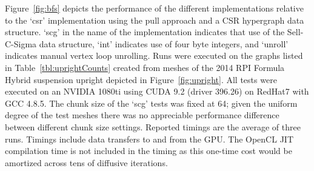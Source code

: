 \documentclass[graybox]{svmult}
\begin{document}
Figure~\ref{fig:bfs} depicts the performance of the different implementations
relative to the `csr' implementation using the pull approach and a CSR
hypergraph data structure.
`scg' in the name of the implementation indicates that use of the Sell-C-Sigma
data structure, `int' indicates use of four byte integers, and `unroll'
indicates manual vertex loop unrolling.
Runs were executed on the graphs listed in Table~\ref{tbl:uprightCounts} created
from meshes of the 2014 RPI Formula Hybrid suspension upright depicted in
Figure~\ref{fig:upright}.
All tests were executed on an NVIDIA 1080ti using CUDA 9.2 (driver 396.26) on
RedHat7 with GCC 4.8.5.
The chunk size of the `scg' tests was fixed at 64; given the uniform degree of
the test meshes there was no appreciable performance difference between
different chunk size settings.
Reported timings are the average of three runs.
Timings include data transfers to and from the GPU.
The OpenCL JIT compilation time is not included in the timing as this one-time
cost would be amortized across tens of diffusive iterations.
\end{document}

